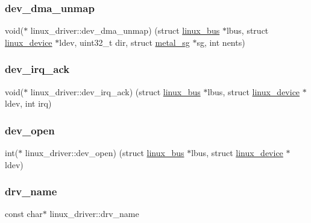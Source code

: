 \subsubsection{\texorpdfstring{dev\+\_\+dma\+\_\+unmap}{dev\_dma\_unmap}}
{\footnotesize\ttfamily void($\ast$ linux\+\_\+driver\+::dev\+\_\+dma\+\_\+unmap) (struct \hyperlink{structlinux__bus}{linux\+\_\+bus} $\ast$lbus, struct \hyperlink{structlinux__device}{linux\+\_\+device} $\ast$ldev, uint32\+\_\+t dir, struct \hyperlink{structmetal__sg}{metal\+\_\+sg} $\ast$sg, int nents)}

\mbox{\label{structlinux__driver_ac82338447fda5bf62e14b2ec0435d623}} 
\subsubsection{\texorpdfstring{dev\+\_\+irq\+\_\+ack}{dev\_irq\_ack}}
{\footnotesize\ttfamily void($\ast$ linux\+\_\+driver\+::dev\+\_\+irq\+\_\+ack) (struct \hyperlink{structlinux__bus}{linux\+\_\+bus} $\ast$lbus, struct \hyperlink{structlinux__device}{linux\+\_\+device} $\ast$ldev, int irq)}

\mbox{\label{structlinux__driver_a04a9c0f4533126f8eb99cba4541d5037}} 
\subsubsection{\texorpdfstring{dev\+\_\+open}{dev\_open}}
{\footnotesize\ttfamily int($\ast$ linux\+\_\+driver\+::dev\+\_\+open) (struct \hyperlink{structlinux__bus}{linux\+\_\+bus} $\ast$lbus, struct \hyperlink{structlinux__device}{linux\+\_\+device} $\ast$ldev)}

\mbox{\label{structlinux__driver_a826db07b5a99a5782c46c61fb0e92f7d}} 
\subsubsection{\texorpdfstring{drv\+\_\+name}{drv\_name}}
{\footnotesize\ttfamily const char$\ast$ linux\+\_\+driver\+::drv\+\_\+name}

